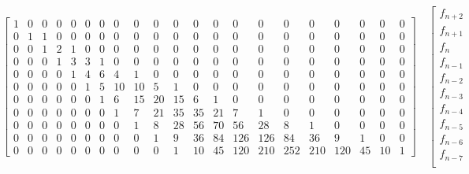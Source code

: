\begin{sidewaystable}

    \begin{displaymath}
        \left[\begin{array}{ccccccccccccccccccccc}
            1 & 0 & 0 & 0 & 0 & 0 & 0 & 0 & 0 & 0 & 0 & 0 & 0 & 0 & 0 & 0 & 0 & 0 & 0 & 0 & 0\\
            0 & 1 & 1 & 0 & 0 & 0 & 0 & 0 & 0 & 0 & 0 & 0 & 0 & 0 & 0 & 0 & 0 & 0 & 0 & 0 & 0\\
            0 & 0 & 1 & 2 & 1 & 0 & 0 & 0 & 0 & 0 & 0 & 0 & 0 & 0 & 0 & 0 & 0 & 0 & 0 & 0 & 0\\
            0 & 0 & 0 & 1 & 3 & 3 & 1 & 0 & 0 & 0 & 0 & 0 & 0 & 0 & 0 & 0 & 0 & 0 & 0 & 0 & 0\\
            0 & 0 & 0 & 0 & 1 & 4 & 6 & 4 & 1 & 0 & 0 & 0 & 0 & 0 & 0 & 0 & 0 & 0 & 0 & 0 & 0\\
            0 & 0 & 0 & 0 & 0 & 1 & 5 & 10 & 10 & 5 & 1 & 0 & 0 & 0 & 0 & 0 & 0 & 0 & 0 & 0 & 0\\
            0 & 0 & 0 & 0 & 0 & 0 & 1 & 6 & 15 & 20 & 15 & 6 & 1 & 0 & 0 & 0 & 0 & 0 & 0 & 0 & 0\\
            0 & 0 & 0 & 0 & 0 & 0 & 0 & 1 & 7 & 21 & 35 & 35 & 21 & 7 & 1 & 0 & 0 & 0 & 0 & 0 & 0\\
            0 & 0 & 0 & 0 & 0 & 0 & 0 & 0 & 1 & 8 & 28 & 56 & 70 & 56 & 28 & 8 & 1 & 0 & 0 & 0 & 0\\
            0 & 0 & 0 & 0 & 0 & 0 & 0 & 0 & 0 & 1 & 9 & 36 & 84 & 126 & 126 & 84 & 36 & 9 & 1 & 0 & 0\\
            0 & 0 & 0 & 0 & 0 & 0 & 0 & 0 & 0 & 0 & 1 & 10 & 45 & 120 & 210 & 252 & 210 & 120 & 45 & 10 & 1
            \end{array}\right]  \quad %
            \left[
                \begin{array}{c}
                    f_{n + 2}\\
                    f_{n + 1}\\
                    f_{n}\\
                    f_{n - 1}\\
                    f_{n - 2}\\
                    f_{n - 3}\\
                    f_{n - 4}\\
                    f_{n - 5}\\
                    f_{n - 6}\\
                    f_{n - 7}\\

\end{array}
\end{displaymath}
\end{sidewaystable}
